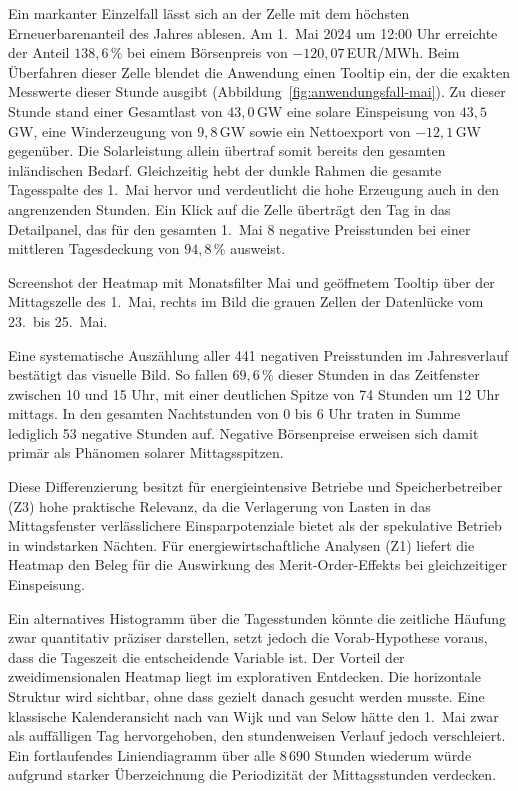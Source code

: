 Ein markanter Einzelfall lässt sich an der Zelle mit dem höchsten Erneuerbarenanteil des Jahres ablesen. Am 1.\ Mai 2024 um 12:00 Uhr erreichte der Anteil $138{,}6\,\%$ bei einem Börsenpreis von $-120{,}07$\,EUR/MWh. Beim Überfahren dieser Zelle blendet die Anwendung einen Tooltip ein, der die exakten Messwerte dieser Stunde ausgibt (Abbildung~\ref{fig:anwendungsfall-mai}). Zu dieser Stunde stand einer Gesamtlast von $43{,}0$\,GW eine solare Einspeisung von $43{,}5$\,GW, eine Winderzeugung von $9{,}8$\,GW sowie ein Nettoexport von $-12{,}1$\,GW gegenüber. Die Solarleistung allein übertraf somit bereits den gesamten inländischen Bedarf. Gleichzeitig hebt der dunkle Rahmen die gesamte Tagesspalte des 1.\ Mai hervor und verdeutlicht die hohe Erzeugung auch in den angrenzenden Stunden. Ein Klick auf die Zelle überträgt den Tag in das Detailpanel, das für den gesamten 1.\ Mai 8 negative Preisstunden bei einer mittleren Tagesdeckung von $94{,}8\,\%$ ausweist.

{Screenshot der Heatmap mit Monatsfilter Mai und geöffnetem Tooltip über der Mittagszelle des 1.\ Mai, rechts im Bild die grauen Zellen der Datenlücke vom 23.\ bis 25.\ Mai.}

Eine systematische Auszählung aller 441 negativen Preisstunden im Jahresverlauf bestätigt das visuelle Bild. So fallen $69{,}6\,\%$ dieser Stunden in das Zeitfenster zwischen 10 und 15 Uhr, mit einer deutlichen Spitze von 74 Stunden um 12 Uhr mittags. In den gesamten Nachtstunden von 0 bis 6 Uhr traten in Summe lediglich 53 negative Stunden auf. Negative Börsenpreise erweisen sich damit primär als Phänomen solarer Mittagsspitzen.

Diese Differenzierung besitzt für energieintensive Betriebe und Speicherbetreiber (Z3) hohe praktische Relevanz, da die Verlagerung von Lasten in das Mittagsfenster verlässlichere Einsparpotenziale bietet als der spekulative Betrieb in windstarken Nächten. Für energiewirtschaftliche Analysen (Z1) liefert die Heatmap den Beleg für die Auswirkung des Merit-Order-Effekts bei gleichzeitiger Einspeisung.

Ein alternatives Histogramm über die Tagesstunden könnte die zeitliche Häufung zwar quantitativ präziser darstellen, setzt jedoch die Vorab-Hypothese voraus, dass die Tageszeit die entscheidende Variable ist. Der Vorteil der zweidimensionalen Heatmap liegt im explorativen Entdecken. Die horizontale Struktur wird sichtbar, ohne dass gezielt danach gesucht werden musste. Eine klassische Kalenderansicht nach van Wijk und van Selow \cite{vanWijk1999} hätte den 1.\ Mai zwar als auffälligen Tag hervorgehoben, den stundenweisen Verlauf jedoch verschleiert. Ein fortlaufendes Liniendiagramm über alle $8\,690$ Stunden wiederum würde aufgrund starker Überzeichnung die Periodizität der Mittagsstunden verdecken.

